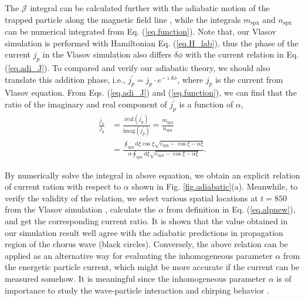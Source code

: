The $\mathcal{J}$ integral can be calculated further with the adiabatic motion of the trapped particle along the magnetic field line \cite{summers2012}, while the integrals $m_\mathrm{spx}$ and $n_\mathrm{spx}$ can be numerical integrated from Eq. (\ref{eq.function}).
Note that, our Vlasov simulation is performed with Hamiltonian Eq. (\ref{eq.H_lab}), thus the phase of the current $j_p$ in the Vlasov simulation also differs $\delta \phi$ with the current relation in Eq. (\ref{eq.adi_J}).
To compared and verify our adiabatic theory, we should also translate this addition phase, i.e., $j^\prime_{p} = j_p \cdot e^{-\imath \delta \phi}$, where $j_p$ is the current from Vlasov equation. 
From Eqs. (\ref{eq.adi_J}) and (\ref{eq.function}), we can find that the ratio of the imaginary and real component of $j^\prime_{p}$ is a function of $\alpha$, 
\begin{equation}\label{eq.adia_relation}
    \begin{aligned}
\frac{j_x}{j_y} &= \frac{\mathrm{real}(j^\prime_p)}{\mathrm{imag}(j^\prime_p)} = \frac{m_\mathrm{spx}}{n_\mathrm{spx}}
\\
& = \frac{\oint_\mathrm{s p x} \mathrm{d} \xi \cos \xi \sqrt{e_\mathrm{s p x}-\cos \xi-\alpha \xi}}{\alpha \oint_\mathrm{s p x} \mathrm{d} \xi \sqrt{e_\mathrm{s p x}-\cos \xi-\alpha \xi}}.
            \end{aligned}
\end{equation}

By numerically solve the integral in above equation, we obtain an explicit relation of current ration with respect to $\alpha$ shown in Fig. \ref{fig.adiabatic}(a). 
Meanwhile, to verify the validity of the relation, we select various spatial locations at $t=850$ from the Vlasov simulation \cite{zheng2023b,zheng2024}, calculate the $\alpha$ from definition in Eq. (\ref{eq.alpnew}), and get the corresponding current ratio.
It is shown that the value obtained in our simulation result well agree with the adiabatic predictions in propagation region of the chorus wave (black circles).
Conversely, the above relation can be applied as an alternative way for evaluating the inhomogeneous parameter $\alpha$ from the energetic particle current, which might be more accurate if the current can be measured somehow.
It is meaningful since the inhomogeneous parameter $\alpha$ is of importance to study the wave-particle interaction and chirping behavior \cite{tao_theoretical_2020,omura2008}.

